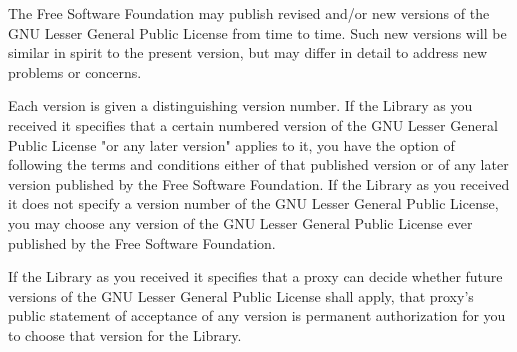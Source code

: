 \begin{DoxyVerbInclude}
  The Free Software Foundation may publish revised and/or new versions
of the GNU Lesser General Public License from time to time. Such new
versions will be similar in spirit to the present version, but may
differ in detail to address new problems or concerns.

  Each version is given a distinguishing version number. If the
Library as you received it specifies that a certain numbered version
of the GNU Lesser General Public License "or any later version"
applies to it, you have the option of following the terms and
conditions either of that published version or of any later version
published by the Free Software Foundation. If the Library as you
received it does not specify a version number of the GNU Lesser
General Public License, you may choose any version of the GNU Lesser
General Public License ever published by the Free Software Foundation.

  If the Library as you received it specifies that a proxy can decide
whether future versions of the GNU Lesser General Public License shall
apply, that proxy's public statement of acceptance of any version is
permanent authorization for you to choose that version for the
Library.
\end{DoxyVerbInclude}
 